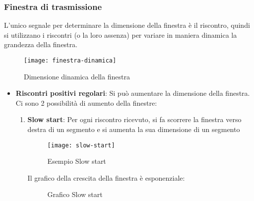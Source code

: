 \documentclass[a4paper]{article}
\begin{document}
\subsubsection{Finestra di trasmissione}
L'unico segnale per determinare la dimensione della finestra è il riscontro, quindi
si utilizzano i riscontri (o la loro assenza) per variare in maniera dinamica la
grandezza della finestra. 
\begin{figure}[H]
  \centering
  \texttt{[image: finestra-dinamica]}
  \caption{Dimensione dinamica della finestra}
\end{figure}
\begin{itemize}
  \item \textbf{Riscontri positivi regolari}: Si può aumentare la dimensione della
    finestra. Ci sono 2 possibilità di aumento della finestre:
    \begin{enumerate}
      \item \textbf{Slow start}: Per ogni riscontro ricevuto, si fa scorrere la finestra
        verso destra di un segmento e si aumenta la sua dimensione di un segmento
        \begin{figure}[H]
          \centering
          \texttt{[image: slow-start]}
          \caption{Esempio Slow start}
        \end{figure}

        \noindent
        Il grafico della crescita della finestra è esponenziale:
        \begin{figure}[H]
          \centering
          \caption{Grafico Slow start}
        \end{figure}


\end{enumerate}
\end{itemize}
\end{document}
